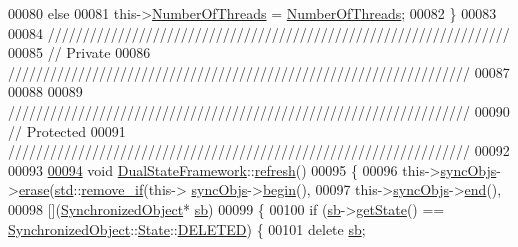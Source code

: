 \begin{DoxyCode}
00080         \textcolor{keywordflow}{else}
00081             \textcolor{keyword}{this}->\hyperlink{namespacedsf_aa16e735f29587f4485b56fc46746f7a9}{NumberOfThreads} = \hyperlink{namespacedsf_aa16e735f29587f4485b56fc46746f7a9}{NumberOfThreads};
00082     \}
00083 
00084     \textcolor{comment}{//////////////////////////////////////////////////////////////////}
00085     \textcolor{comment}{// Private}
00086     \textcolor{comment}{//////////////////////////////////////////////////////////////////}
00087 
00088 
00089     \textcolor{comment}{//////////////////////////////////////////////////////////////////}
00090     \textcolor{comment}{// Protected}
00091     \textcolor{comment}{//////////////////////////////////////////////////////////////////}
00092 
00093 
\hypertarget{_dual_state_framework_8cpp_source_l00094}{}\hyperlink{classdsf_1_1_dual_state_framework_afe53c4d52bfb56b0b73c6b9fd397b007}{00094}     \textcolor{keywordtype}{void} \hyperlink{namespacedsf_aa16e735f29587f4485b56fc46746f7a9}{DualStateFramework}::\hyperlink{namespacedsf_aa16e735f29587f4485b56fc46746f7a9}{refresh}()
00095     \{
00096         \textcolor{keyword}{this}->\hyperlink{namespacedsf_aa16e735f29587f4485b56fc46746f7a9}{syncObjs}->\hyperlink{namespacedsf_aa16e735f29587f4485b56fc46746f7a9}{erase}(\hyperlink{namespacedsf_aa16e735f29587f4485b56fc46746f7a9}{std}::\hyperlink{namespacedsf_aa16e735f29587f4485b56fc46746f7a9}{remove\_if}(\textcolor{keyword}{this}->
      \hyperlink{namespacedsf_aa16e735f29587f4485b56fc46746f7a9}{syncObjs}->\hyperlink{namespacedsf_aa16e735f29587f4485b56fc46746f7a9}{begin}(),
00097                                              \textcolor{keyword}{this}->\hyperlink{namespacedsf_aa16e735f29587f4485b56fc46746f7a9}{syncObjs}->\hyperlink{namespacedsf_aa16e735f29587f4485b56fc46746f7a9}{end}(),
00098                                              [](\hyperlink{namespacedsf_aa16e735f29587f4485b56fc46746f7a9}{SynchronizedObject}* 
      \hyperlink{namespacedsf_aa16e735f29587f4485b56fc46746f7a9}{sb})
00099                                              \{
00100                                                  \textcolor{keywordflow}{if} (\hyperlink{namespacedsf_aa16e735f29587f4485b56fc46746f7a9}{sb}->\hyperlink{namespacedsf_aa16e735f29587f4485b56fc46746f7a9}{getState}() == 
      \hyperlink{namespacedsf_aa16e735f29587f4485b56fc46746f7a9}{SynchronizedObject}::\hyperlink{namespacedsf_aa16e735f29587f4485b56fc46746f7a9}{State}::\hyperlink{namespacedsf_aa16e735f29587f4485b56fc46746f7a9}{DELETED}) \{
00101                                                      \textcolor{keyword}{delete} \hyperlink{namespacedsf_aa16e735f29587f4485b56fc46746f7a9}{sb};

\end{DoxyCode}
